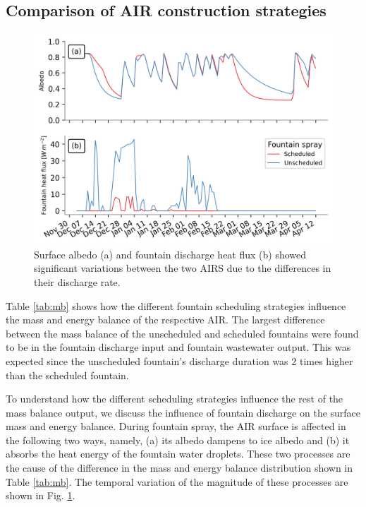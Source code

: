 \documentclass[tc, manuscript]{copernicus}
\begin{document}
\subsection{Comparison of AIR construction strategies}

\begin{figure}[t]
\includegraphics[width=12cm]{Figures/dis_processes.png}
\caption{Surface albedo (a) and fountain discharge heat flux (b) showed significant variations between the two
  AIRS due to the differences in their discharge rate.}
\label{fig:dis_processes}
\end{figure}

Table \ref{tab:mb} shows how the different fountain scheduling strategies influence the mass and energy balance
of the respective AIR. The largest difference between the mass balance of the unscheduled and scheduled
fountains were found to be in the fountain discharge input and fountain wastewater output. This was expected
since the unscheduled fountain's discharge duration was 2 times higher than the scheduled fountain.

To understand how the different scheduling strategies influence the rest of the mass balance output, we discuss
the influence of fountain discharge on the surface mass and energy balance. During fountain spray, the AIR
surface is affected in the following two ways, namely, (a) its albedo dampens to ice albedo and (b) it absorbs
the heat energy of the fountain water droplets. These two processes are the cause of the difference in the mass
and energy balance distribution shown in Table \ref{tab:mb}. The temporal variation of the magnitude of these
processes are shown in Fig. \ref{fig:dis_processes}. 
\end{document}
